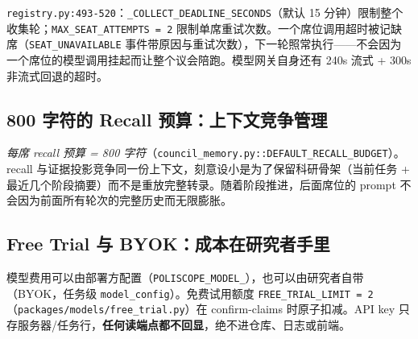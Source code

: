 \texttt{registry.py:493-520}：\texttt{\_COLLECT\_DEADLINE\_SECONDS}（默认 15 分钟）限制整个收集轮；\texttt{MAX\_SEAT\_ATTEMPTS = 2} 限制单席重试次数。一个席位调用超时被记缺席（\texttt{SEAT\_UNAVAILABLE} 事件带原因与重试次数），下一轮照常执行——不会因为一个席位的模型调用挂起而让整个议会陪跑。模型网关自身还有 240s 流式 + 300s 非流式回退的超时。

\subsection{800 字符的 Recall 预算：上下文竞争管理}

\emph{每席 recall 预算 = 800 字符}（\texttt{council\_memory.py::DEFAULT\_RECALL\_BUDGET}）。recall 与证据投影竞争同一份上下文，刻意设小是为了保留科研骨架（当前任务 + 最近几个阶段摘要）而不是重放完整转录。随着阶段推进，后面席位的 prompt 不会因为前面所有轮次的完整历史而无限膨胀。

\subsection{Free Trial 与 BYOK：成本在研究者手里}

模型费用可以由部署方配置（\texttt{POLISCOPE\_MODEL\_\*}），也可以由研究者自带（BYOK，任务级 \texttt{model\_config}）。免费试用额度 \texttt{FREE\_TRIAL\_LIMIT = 2}（\texttt{packages/models/free\_trial.py}）在 confirm-claims 时原子扣减。API key 只存服务器/任务行，\textbf{任何读端点都不回显}，绝不进仓库、日志或前端。
